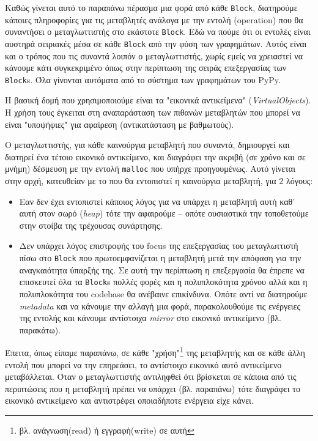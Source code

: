 Καθώς γίνεται αυτό το παραπάνω πέρασμα μια φορά από κάθε \texttt{Block},
διατηρούμε κάποιες πληροφορίες για τις μεταβλητές ανάλογα με την εντολή
(operation) που θα συναντήσει ο μεταγλωττιστής στο εκάστοτε \texttt{Block}. Εδώ
να πούμε ότι οι εντολές είναι αυστηρά σειριακές μέσα σε κάθε \texttt{Block} από
την φύση των γραφημάτων. Αυτός είναι και ο τρόπος που τις συναντά λοιπόν ο
μεταγλωττιστής, χωρίς εμείς να χρειαστεί να κάνουμε κάτι συγκεκριμένο όπως στην
περίπτωση της σειράς επεξεργασίας των \texttt{Block}s. Όλα γίνονται αυτόματα από
το σύστημα των γραφημάτων του PyPy.

Η βασική δομή που χρησιμοποιούμε είναι τα "εικονικά αντικείμενα"
(\textit{VirtualObjects}). H χρήση τους έγκειται στη αναπαράσταση των πιθανών
μεταβλητών που μπορεί να είναι "υποψήφιες" για αφαίρεση (αντικατάσταση με
βαθμωτούς).

Ο μεταγλωττιστής, για κάθε καινούργια μεταβλητή που συναντά, δημιουργεί και
διατηρεί ένα τέτοιο εικονικό αντικείμενο, και διαγράφει την ακριβή (σε χρόνο και
σε μνήμη) δέσμευση με την εντολή \texttt{malloc} που υπήρχε προηγουμένως. Αυτό
γίνεται στην αρχή, κατευθείαν με το που θα εντοπιστεί η καινούργια μεταβλητή,
για 2 λόγους:

\begin{itemize}

\item Εαν δεν έχει εντοπιστεί κάποιος λόγος για να υπάρχει η μεταβλητή αυτή
καθ' αυτή στον σωρό (\textit{heap}) τότε την αφαιρούμε – οπότε ουσιαστικά την
τοποθετούμε στην στοίβα της τρέχουσας συνάρτησης.

\item Δεν υπάρχει λόγος επιστροφής του focus της επεξεργασίας του μεταγλωττιστή
πίσω στο \texttt{Block} που πρωτοεμφανίζεται η μεταβλητή μετά την απόφαση για
την αναγκαιότητα ύπαρξής της. Σε αυτή την περίπτωση η επεξεργασία θα έπρεπε να
επισκευτεί όλα τα \texttt{Block}s πολλές φορές και η πολυπλοκότητα χρόνου αλλά
και η πολυπλοκότητα του codebase θα ανέβαινε επικίνδυνα. Οπότε αντί να
διατηρούμε \textit{metadata} και να κάνουμε την αλλαγή μια φορά, παρακολουθούμε
τις ενέργειες της εντολής και κάνουμε αντίστοιχα \textit{mirror} στο εικονικό
αντικείμενο (βλ. παρακάτω).

\end{itemize}

Έπειτα, όπως είπαμε παραπάνω, σε κάθε "χρήση"\footnote{βλ. ανάγνωση(read) ή
εγγραφή(write) σε αυτή} της μεταβλητής και σε κάθε άλλη εντολή που μπορεί να την
επηρεάσει, το αντίστοιχο εικονικό αυτό αντικείμενο μεταβάλλεται. Όταν ο
μεταγλωττιστής αντιληφθεί ότι βρίσκεται σε κάποια από τις περιπτώσεις που η
μεταβλητή πρέπει να υπάρχει (βλ. παραπάνω) τότε διαγράφει το εικονικό
αντικείμενο και αντιστρέφει οποιαδήποτε ενέργεια είχε κάνει.

